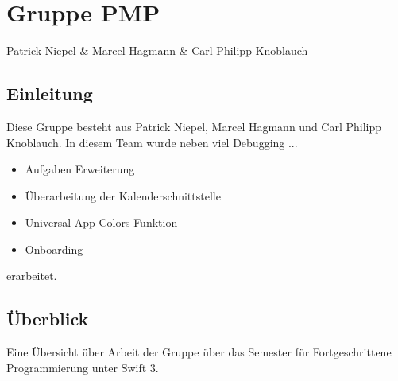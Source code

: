 
\chapter{Gruppe PMP}
Patrick Niepel \& Marcel Hagmann \& Carl Philipp Knoblauch

\section{Einleitung}
Diese Gruppe besteht aus Patrick Niepel, Marcel Hagmann und Carl Philipp Knoblauch. In diesem Team wurde neben viel Debugging ...
\begin{itemize}
\item Aufgaben Erweiterung
\item Überarbeitung der Kalenderschnittstelle
\item Universal App Colors Funktion
\item Onboarding
\end{itemize}
erarbeitet.

\section{Überblick}
Eine Übersicht über Arbeit der Gruppe über das Semester für Fortgeschrittene Programmierung unter Swift 3.

